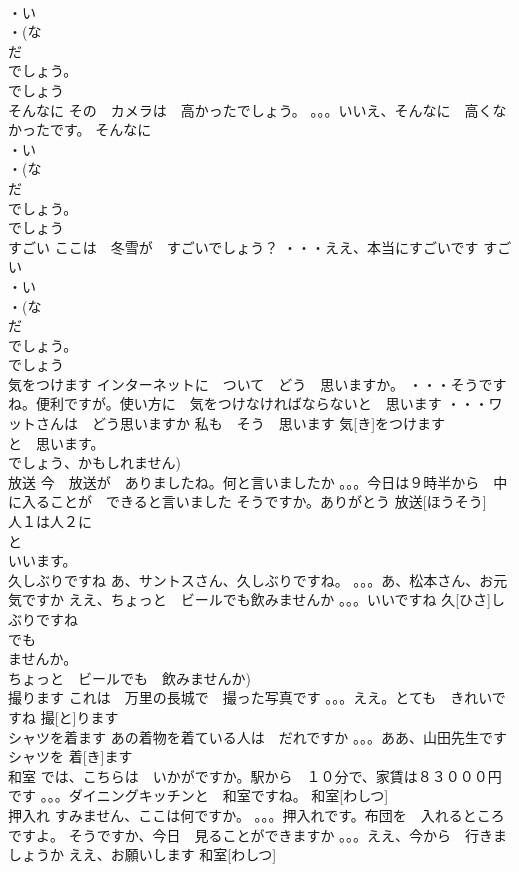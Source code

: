 \documentclass[8pt]{extreport}
\begin{document}
\begin{CJK}{UTF8}{min}
\\	・い
\\	・(な
\\	だ
\\	でしょう。
\\	でしょう　
\\	そんなに	その　カメラは　高かったでしょう。 。。。いいえ、そんなに　高くなかったです。	そんなに			
\\	・い
\\	・(な
\\	だ
\\	でしょう。
\\	でしょう　
\\	すごい	ここは　冬雪が　すごいでしょう？ ・・・ええ、本当にすごいです	すごい			
\\	・い
\\	・(な
\\	だ
\\	でしょう。
\\	でしょう　
\\	気をつけます	インターネットに　ついて　どう　思いますか。 ・・・そうですね。便利ですが。使い方に　気をつけなければならないと　思います ・・・ワットさんは　どう思いますか 私も　そう　思います	気[き]をつけます			
\\	と　思います。
\\	でしょう、かもしれません)		
\\	放送	今　放送が　ありましたね。何と言いましたか 。。。今日は９時半から　中に入ることが　できると言いました そうですか。ありがとう	放送[ほうそう]			
\\	人１は人２に
\\	と　
\\	いいます。
\\	久しぶりですね	あ、サントスさん、久しぶりですね。 。。。あ、松本さん、お元気ですか ええ、ちょっと　ビールでも飲みませんか 。。。いいですね	久[ひさ]しぶりですね			
\\	でも　
\\	ませんか。
\\	ちょっと　ビールでも　飲みませんか)	
\\	撮ります	これは　万里の長城で　撮った写真です 。。。ええ。とても　きれいですね	撮[と]ります			
\\	シャツを着ます	あの着物を着ている人は　だれですか 。。。ああ、山田先生です	シャツを 着[き]ます			
\\	和室	では、こちらは　いかがですか。駅から　１０分で、家賃は８３０００円です 。。。ダイニングキッチンと　和室ですね。	和室[わしつ]			
\\	押入れ	すみません、ここは何ですか。 。。。押入れです。布団を　入れるところですよ。 そうですか、今日　見ることができますか 。。。ええ、今から　行きましょうか ええ、お願いします	和室[わしつ]			

\end{CJK}
\end{document}
